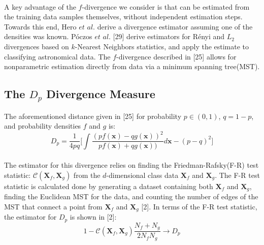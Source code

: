 \documentclass{article}
\begin{document}
	\\ [0.5ex]	
	\indent A key advantage of the $f$-divergence we consider is that can be estimated from the training data samples themselves, without independent estimation steps. Towards this end, Hero $et$ $al.$ derive a divergence estimator assuming one of the densities was known. P{\'o}czos $et$ $al.$ [29] derive estimators for R{\'e}nyi and $L_2$ divergences based on $k$-Nearest Neighbors statistics, and apply the estimate to classifying astronomical data. The $f$-divergence described in [25] allows for nonparametric estimation directly from data via a minimum spanning tree(MST). 
	\subsection{\small The $D_p$ Divergence Measure}
	The aforementioned distance given in [25] for probability $p\in (0,1)$, $q=1-p$, and probability densities $f$ and $g$ is:
	\begin{equation}
			D_p=\frac{1}{4pq}\bigg[ \int \frac{(pf(\textbf{x})-qg(\textbf{x}))^2}{pf(\textbf{x})+qg(\textbf{x}))}d\textbf{x}-(p-q)^2 \bigg]
	\end{equation}
	\\[0.5ex]
	\indent The estimator for this divergence relies on finding the Friedman-Rafsky(F-R) test statistic: $\mathcal{C}(\textbf{X}_f,\textbf{X}_g)$ from the $d$-dimensional class data $\textbf{X}_f$ and $\textbf{X}_g$. The F-R test statistic is calculated done by generating a dataset containing both $\textbf{X}_f$ and $\textbf{X}_g$, finding the Euclidean MST for the data, and counting the number of edges of the MST that connect a point from $\textbf{X}_f$ and $\textbf{X}_g$ [2]. In terms of the F-R test statistic, the estimator for $D_p$ is shown in [2]:
	\begin{equation}
	1 - \mathcal{C}(\textbf{X}_f,\textbf{X}_g)\frac{N_f+N_g}{2N_f N_g} \rightarrow D_p
	\end{equation}
			
\end{document}
